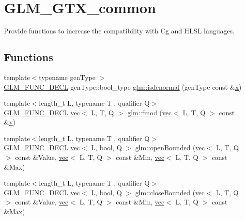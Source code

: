 \hypertarget{group__gtx__common}{}\section{G\+L\+M\+\_\+\+G\+T\+X\+\_\+common}
\label{group__gtx__common}


Provide functions to increase the compatibility with Cg and H\+L\+SL languages.  


\subsection*{Functions}
\begin{DoxyCompactItemize}
\item 
{\footnotesize template$<$typename gen\+Type $>$ }\\\mbox{\hyperlink{setup_8hpp_ab2d052de21a70539923e9bcbf6e83a51}{G\+L\+M\+\_\+\+F\+U\+N\+C\+\_\+\+D\+E\+CL}} gen\+Type\+::bool\+\_\+type \mbox{\hyperlink{group__gtx__common_ga74aa7c7462245d83bd5a9edf9c6c2d91}{glm\+::isdenormal}} (gen\+Type const \&\mbox{\hyperlink{_s_d_l__opengl_8h_ad0e63d0edcdbd3d79554076bf309fd47}{x}})
\item 
{\footnotesize template$<$length\+\_\+t L, typename T , qualifier Q$>$ }\\\mbox{\hyperlink{setup_8hpp_ab2d052de21a70539923e9bcbf6e83a51}{G\+L\+M\+\_\+\+F\+U\+N\+C\+\_\+\+D\+E\+CL}} \mbox{\hyperlink{structglm_1_1vec}{vec}}$<$ L, T, Q $>$ \mbox{\hyperlink{group__gtx__common_gae5e80425df9833164ad469e83b475fb4}{glm\+::fmod}} (\mbox{\hyperlink{structglm_1_1vec}{vec}}$<$ L, T, Q $>$ const \&\mbox{\hyperlink{_s_d_l__opengl_8h_a10a82eabcb59d2fcd74acee063775f90}{v}})
\item 
{\footnotesize template$<$length\+\_\+t L, typename T , qualifier Q$>$ }\\\mbox{\hyperlink{setup_8hpp_ab2d052de21a70539923e9bcbf6e83a51}{G\+L\+M\+\_\+\+F\+U\+N\+C\+\_\+\+D\+E\+CL}} \mbox{\hyperlink{structglm_1_1vec}{vec}}$<$ L, bool, Q $>$ \mbox{\hyperlink{group__gtx__common_gafd303042ba2ba695bf53b2315f53f93f}{glm\+::open\+Bounded}} (\mbox{\hyperlink{structglm_1_1vec}{vec}}$<$ L, T, Q $>$ const \&Value, \mbox{\hyperlink{structglm_1_1vec}{vec}}$<$ L, T, Q $>$ const \&Min, \mbox{\hyperlink{structglm_1_1vec}{vec}}$<$ L, T, Q $>$ const \&Max)
\item 
{\footnotesize template$<$length\+\_\+t L, typename T , qualifier Q$>$ }\\\mbox{\hyperlink{setup_8hpp_ab2d052de21a70539923e9bcbf6e83a51}{G\+L\+M\+\_\+\+F\+U\+N\+C\+\_\+\+D\+E\+CL}} \mbox{\hyperlink{structglm_1_1vec}{vec}}$<$ L, bool, Q $>$ \mbox{\hyperlink{group__gtx__common_gab7d89c14c48ad01f720fb5daf8813161}{glm\+::close\+Bounded}} (\mbox{\hyperlink{structglm_1_1vec}{vec}}$<$ L, T, Q $>$ const \&Value, \mbox{\hyperlink{structglm_1_1vec}{vec}}$<$ L, T, Q $>$ const \&Min, \mbox{\hyperlink{structglm_1_1vec}{vec}}$<$ L, T, Q $>$ const \&Max)
\end{DoxyCompactItemize}


